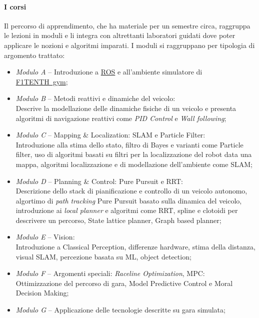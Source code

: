 \paragraph{I corsi}
Il percorso di apprendimento, che ha materiale per un semestre circa,
raggruppa le lezioni in moduli e li integra con altrettanti laboratori guidati
dove poter applicare le nozioni e algoritmi imparati.
\newpage %
\noindent I moduli si raggruppano per tipologia di argomento trattato:
\begin{itemize}
	\item \textit{Modulo A} -- Introduzione a \hyperref[sec:ros]{ROS} e 
		all'ambiente simulatore di \hyperref[par:gym]{F1TENTH~gym};
	\item \textit{Modulo B} -- Metodi reattivi e dinamiche del veicolo: \\
	      Descrive la modellazione delle dinamiche fisiche di un veicolo e presenta algoritmi di navigazione
	      reattivi come \textit{PID Control} e \textit{Wall following};
	\item \textit{Modulo C} -- Mapping \& Localization: SLAM e Particle Filter:\\
	      Introduzione alla stima dello stato, filtro di Bayes e varianti come Particle filter, uso di
	      algoritmi basati su filtri per la localizzazione del robot data una mappa, algoritmi localizzazione e
	      di modellazione dell'ambiente come SLAM;
	\item \textit{Modulo D} -- Planning \& Control: Pure Pursuit e RRT:\\
	      Descrizione dello stack di pianificazione e controllo di un veicolo autonomo, algortimo di
	      \textit{path tracking} Pure Pursuit basato sulla dinamica del veicolo, introduzione ai
	      \textit{local planner} e algoritmi come RRT, spline e clotoidi per descrivere un percorso,
	      State lattice planner, Graph based planner;
	\item \textit{Modulo E} -- Vision:\\
	      Introduzione a Classical Perception, differenze hardware, stima della distanza, visual SLAM,
	      percezione basata su ML, object detection;
	\item \textit{Modulo F} -- Argomenti speciali: \textit{Raceline Optimization}, MPC:\\
	      Ottimizzazione del percorso di gara, Model Predictive Control e Moral Decision Making;
	\item \textit{Modulo G} -- Applicazione delle tecnologie descritte su gara simulata;
\end{itemize}

